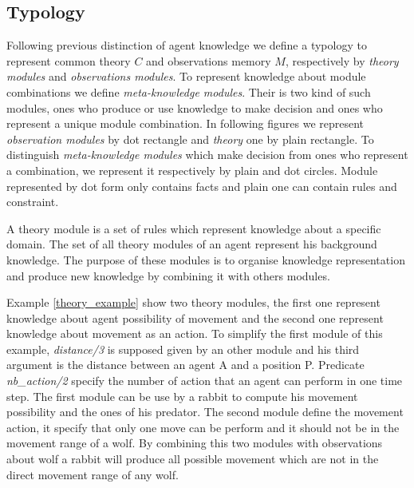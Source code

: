 \documentclass{aamas2012}
\begin{document}
\subsection{Typology}

	Following previous distinction of agent knowledge we define a typology to represent common theory $C$ and observations memory $M$,
	respectively by \emph{theory modules} and \emph{observations modules}.
	To represent knowledge about module combinations we define \emph{meta-knowledge modules}.
	Their is two kind of such modules, ones who produce or use knowledge to make decision and ones who represent a unique module combination.
	In following figures we represent \emph{observation modules} by dot rectangle and  \emph{theory} one by plain rectangle.
	To distinguish \emph{meta-knowledge modules} which make decision from ones who represent a combination, we represent it respectively by plain and dot circles.
	Module represented by dot form only contains facts and plain one can contain rules and constraint.

	\begin{definition}
		A theory module is a set of rules which represent knowledge about a specific domain.
		The set of all theory modules of an agent represent his background knowledge.
		The purpose of these modules is to organise knowledge representation and produce
		new knowledge by combining it with others modules.
	\end{definition}
	
	Example \ref{theory_example} show two theory modules, the first one represent knowledge about agent possibility of movement and 
	the second one represent knowledge about movement as an action.
	To simplify the first module of this example, \textit{distance/3} is supposed given by an other module and 
	his third argument is the distance between an agent A and a position P.
	Predicate \textit{nb\_action/2} specify the number of action that an agent can perform in one time step.
	The first module can be use by a rabbit to compute his movement possibility and the ones of his predator.
	The second module define the movement action, it specify that only one move can be perform and it should not be in the movement range of a wolf.
	By combining this two modules with observations about wolf a rabbit will produce all possible movement which are not in the direct movement range of any wolf.
	
\end{document}
